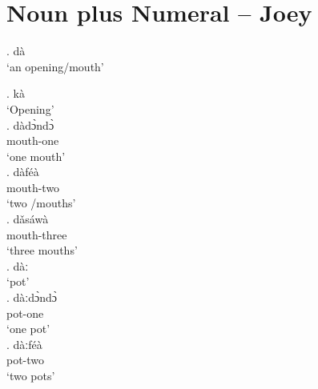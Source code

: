 \documentclass{assets/fieldnotes}
\begin{document}
\section{Noun plus Numeral -- Joey} 



\ex. dà\\
`an opening/mouth'

\ex. kà\\
`Opening'\\

\ex. dàdɔ̀ndɔ̀\\
mouth-one\\
`one mouth' \\

\ex. dàféà\\
mouth-two\\
`two /mouths' \\

\ex. dǎsáwà\\
mouth-three\\
`three mouths' \\

\ex. dàː\\
`pot'\\

\ex. dàːdɔ̀ndɔ̀\\
pot-one\\
`one pot'\\

\ex. dàːféà\\
pot-two\\
`two pots'\\
\end{document}

